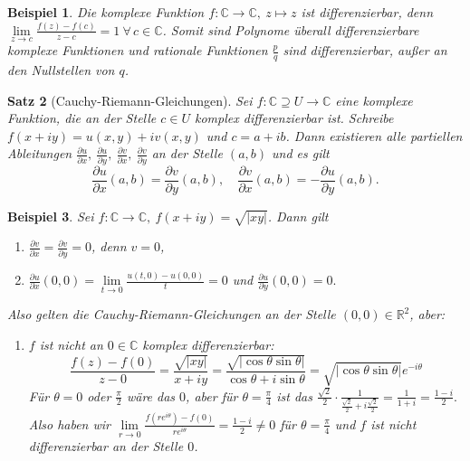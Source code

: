 \documentclass[a4paper,12pt]{article}
\theoremstyle{newthm}
\newtheorem{thm}{Satz}[subsection]
\theoremstyle{newdef}
\theoremstyle{newrem}
\newtheorem{exmp}[thm]{Beispiel}
\newcommand{\R}{\mathbb{R}}
\newcommand{\C}{\mathbb{C}}
\newcommand{\del}{\partial}
\begin{document}
		\begin{exmp}\label{exmppolyn}
			Die komplexe Funktion $ f: \C \to \C,\ z \mapsto z $ ist differenzierbar, denn $ \lim\limits_{z \to c} \frac{f(z)-f(c)}{z-c} = 1 \ \forall \, c \in \C $. Somit sind Polynome überall differenzierbare komplexe Funktionen und rationale Funktionen $ \frac{p}{q} $ sind differenzierbar, außer an den Nullstellen von $q$.
		\end{exmp}
		
		\begin{thm}[Cauchy-Riemann-Gleichungen]
			Sei $ f: \C \supseteq U \to \C $ eine komplexe Funktion, die an der Stelle $ c \in U $ komplex differenzierbar ist. Schreibe $ f(x+iy) = u(x,y) + iv(x,y) $ und $ c = a+ib $. Dann existieren alle partiellen Ableitungen $ \frac{\del u}{\del x},\ \frac{\del u}{\del y},\ \frac{\del v}{\del x},\ \frac{\del v}{\del y} $ an der Stelle $ (a,b) $ und es gilt 
			$$ \frac{\del u}{\del x}(a,b) = \frac{\del v}{\del y}(a,b),\quad \frac{\del v}{\del x}(a,b) = - \frac{\del u}{\del y}(a,b). $$
		\end{thm}
		
		\begin{exmp}
			Sei $ f:\C \to \C,\ f(x+iy) = \sqrt{|xy|} $. Dann gilt 
			\begin{enumerate}
				\item $ \frac{\del v}{\del x} = \frac{\del v}{\del y} = 0 $, denn $ v = 0 $,
				\item $ \frac{\del u}{\del x}(0,0) = \lim\limits_{t \to 0} \frac{u(t,0) - u(0,0)}{t} = 0 $ und $ \frac{\del u}{\del y}(0,0) = 0. $
			\end{enumerate}
			Also gelten die Cauchy-Riemann-Gleichungen an der Stelle $ (0,0) \in \R^2 $, aber:
			\begin{enumerate}[resume] 
				\item $f$ ist nicht an $ 0 \in \C $ komplex differenzierbar: 
				$$ \frac{f(z) - f(0)}{z-0} = \frac{\sqrt{|xy|}}{x+iy} = \frac{\sqrt{|\cos\theta\sin\theta|}}{\cos\theta + i\sin\theta} = \sqrt{|\cos\theta\sin\theta|}e^{-i\theta} $$
				Für $ \theta = 0 $ oder $ \frac{\pi}{2} $ wäre das $0$, aber für $ \theta = \frac{\pi}{4} $ ist das $ \frac{\sqrt{2}}{2} \cdot \frac{1}{\frac{\sqrt{2}}{2} + i\frac{\sqrt{2}}{2}} = \frac{1}{1+i} = \frac{1-i}{2}. $ Also haben wir $ \lim\limits_{r \to 0} \frac{f(re^{i\theta}) - f(0)}{re^{i\theta}} = \frac{1-i}{2} \neq 0 $ für $ \theta = \frac{\pi}{4} $ und $f$ ist nicht differenzierbar an der Stelle $0$.
			\end{enumerate}
		\end{exmp}
		
\end{document}
